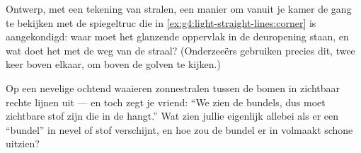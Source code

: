\begin{exercise}[$\star\star$]\label{exo:g4:light-straight-lines:10}
Ontwerp, met een tekening van stralen, een manier om vanuit je kamer
de gang te bekijken met de spiegeltruc die in
\cref{ex:g4:light-straight-lines:corner} is aangekondigd: waar moet
het glanzende oppervlak in de deuropening staan, en wat doet het met
de weg van de straal? (Onderzeeërs gebruiken precies dit, twee keer
boven elkaar, om boven de golven te kijken.)
\end{exercise}

\begin{exercise}[$\star\star$]\label{exo:g4:light-straight-lines:11}
Op een nevelige ochtend waaieren zonnestralen tussen de bomen in
zichtbaar rechte lijnen uit --- en toch zegt je vriend: ``We zien de
bundels, dus  moet zichtbare stof zijn die in de  hangt.''
Wat zien jullie eigenlijk allebei als er een ``bundel'' in nevel of
stof verschijnt, en hoe zou de bundel er in volmaakt schone
 uitzien?
\end{exercise}
